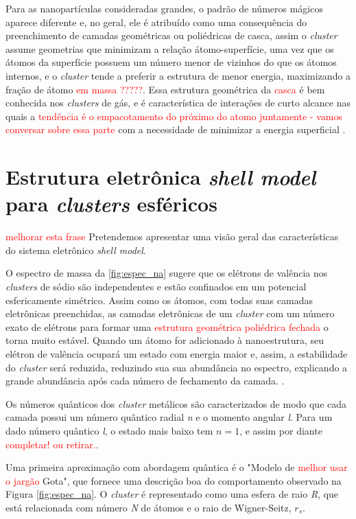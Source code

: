 Para as nanopartículas consideradas grandes, o padrão de números mágicos aparece diferente e, no geral, ele é atribuído como uma consequência do preenchimento de camadas geométricas ou poliédricas de casca, assim o \textit{cluster} assume geometrias que minimizam a relação átomo-superfície, uma vez que os átomos da superfície possuem um número menor de vizinhos do que os átomos internos, e o \textit{cluster} tende a preferir a estrutura de menor energia, maximizando a fração de átomo \textcolor{red}{em massa ?????}. Essa estrutura geométrica da \textcolor{red}{casca} é bem conhecida nos \textit{clusters} de gás, e é característica de interações de curto alcance nas quais a \textcolor{red}{tendência é o empacotamento do próximo do atomo juntamente - vamos conversar sobre essa parte} com a necessidade de minimizar a energia superficial \cite{capitulo_livro_shell}.


\section{Estrutura eletrônica \textit{shell model} para \textit{clusters} esféricos} \label{section_shell_model}

\textcolor{red}{melhorar esta frase} Pretendemos apresentar uma visão geral das características do sistema eletrônico \textit{shell model}.

O espectro de massa da \ref{fig:espec_na} sugere que os elétrons de valência nos \textit{clusters} de sódio são independentes e estão confinados em um potencial esfericamente simétrico. Assim como os átomos, com todas suas camadas eletrônicas preenchidas, as camadas eletrônicas de um \textit{cluster} com um número exato de elétrons para formar uma \textcolor{red}{estrutura geométrica poliédrica fechada} o torna muito estável. Quando um átomo for adicionado à nanoestrutura, seu elétron de valência ocupará um estado com energia maior e, assim, a estabilidade do \textit{cluster} será reduzida, reduzindo sua sua abundância no espectro, explicando a grande abundância após cada número de fechamento da camada. \cite{capitulo_livro_shell}.

Os números quânticos dos \textit{cluster} metálicos são caracterizados de modo que cada camada possui um número quântico radial \textit{n} e o momento angular \textit{l}. Para um dado número quântico \textit{l}, o estado mais baixo tem $n = 1$, e assim por diante \textcolor{red}{completar! ou retirar.}.


Uma primeira aproximação com abordagem quântica é o "Modelo de \textcolor{red}{melhor usar o jargão} Gota", que fornece uma descrição boa do comportamento observado na Figura \ref{fig:espec_na}. O \textit{cluster} é representado como uma esfera de raio \textit{R}, que está relacionada com número \textit{N} de átomos e o raio de Wigner-Seitz, $r_{s}$\cite{capitulo_livro_shell}\cite{livro_cap16_Misra2012527}.


